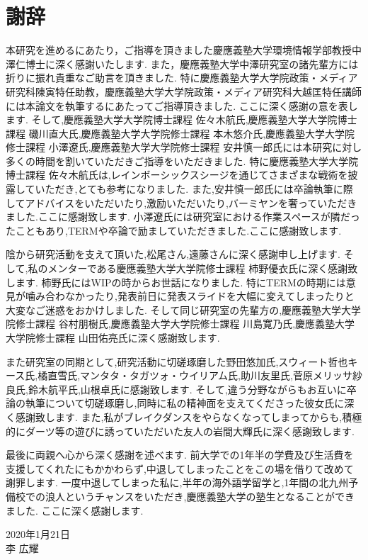 \chapter*{謝辞}
本研究を進めるにあたり，ご指導を頂きました慶應義塾大学環境情報学部教授中澤仁博士に深く感謝いたします.
また，慶應義塾大学中澤研究室の諸先輩方には折りに振れ貴重なご助言を頂きました.
特に慶應義塾大学大学院政策・メディア研究科陳寅特任助教，慶應義塾大学大学院政策・メディア研究科大越匡特任講師には本論文を執筆するにあたってご指導頂きました.
ここに深く感謝の意を表します.
そして,慶應義塾大学大学院博士課程 佐々木航氏,慶應義塾大学大学院博士課程 磯川直大氏,慶應義塾大学大学院修士課程 本木悠介氏,慶應義塾大学大学院修士課程 小澤遼氏,慶應義塾大学大学院修士課程 安井慎一郎氏には本研究に対し多くの時間を割いていただきご指導をいただきました.
特に慶應義塾大学大学院博士課程 佐々木航氏は,レインボーシックスシージを通じてさまざまな戦術を披露していただき,とても参考になりました.
また,安井慎一郎氏には卒論執筆に際してアドバイスをいただいたり,激励いただいたり,バーミヤンを奢っていただきました.ここに感謝致します.
小澤遼氏には研究室における作業スペースが隣だったこともあり,TERMや卒論で励ましていただきました.ここに感謝致します.

陰から研究活動を支えて頂いた,松尾さん,遠藤さんに深く感謝申し上げます.
そして,私のメンターである慶應義塾大学大学院修士課程 柿野優衣氏に深く感謝致します.
柿野氏にはWIPの時からお世話になりました.
特にTERMの時期には意見が噛み合わなかったり,発表前日に発表スライドを大幅に変えてしまったりと大変なご迷惑をおかけしました.
そして同じ研究室の先輩方の,慶應義塾大学大学院修士課程 谷村朋樹氏,慶應義塾大学大学院修士課程 川島寛乃氏,慶應義塾大学大学院修士課程 山田佑亮氏に深く感謝致します.

また研究室の同期として,研究活動に切磋琢磨した野田悠加氏,スウィート哲也キース氏,橘直雪氏,マンタタ・タガツォ・ウイリアム氏,助川友里氏,菅原メリッサ紗良氏,鈴木航平氏,山根卓氏に感謝致します.
そして,違う分野ながらもお互いに卒論の執筆について切磋琢磨し,同時に私の精神面を支えてくださった彼女氏に深く感謝致します.
また,私がブレイクダンスをやらなくなってしまってからも,積極的にダーツ等の遊びに誘っていただいた友人の岩間大輝氏に深く感謝致します.

最後に両親へ心から深く感謝を述べます.
前大学での1年半の学費及び生活費を支援してくれたにもかかわらず,中退してしまったことをこの場を借りて改めて謝罪します.
一度中退してしまった私に,半年の海外語学留学と,1年間の北九州予備校での浪人というチャンスをいただき,慶應義塾大学の塾生となることができました.
ここに深く感謝します.

\begin{flushright}
2020年1月21日\\
李 広耀
\end{flushright}
